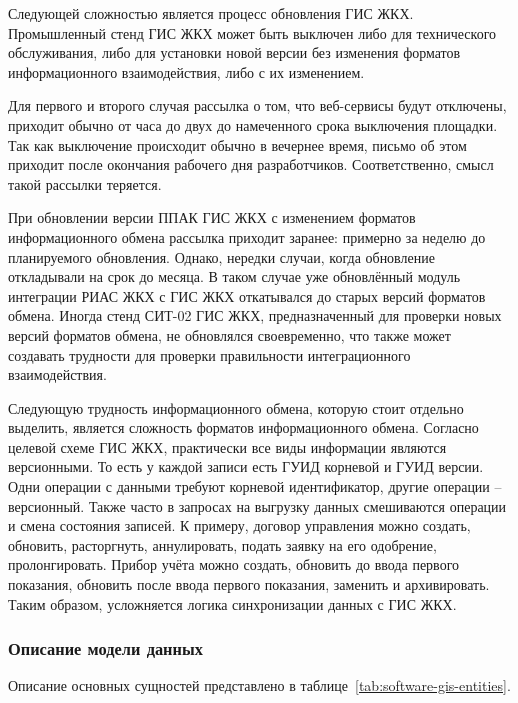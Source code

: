 Следующей сложностью является процесс обновления ГИС ЖКХ.
Промышленный стенд ГИС ЖКХ может быть выключен либо для технического обслуживания, либо для установки новой версии без изменения форматов информационного взаимодействия, либо с их изменением.

Для первого и второго случая рассылка о том, что веб-сервисы будут отключены, приходит обычно от часа до двух до намеченного срока выключения площадки.
Так как выключение происходит обычно в вечернее время, письмо об этом приходит после окончания рабочего дня разработчиков.
Соответственно, смысл такой рассылки теряется.

При обновлении версии ППАК ГИС ЖКХ с изменением форматов информационного обмена рассылка приходит заранее: примерно за неделю до планируемого обновления.
Однако, нередки случаи, когда обновление откладывали на срок до месяца.
В таком случае уже обновлённый модуль интеграции РИАС ЖКХ с ГИС ЖКХ откатывался до старых версий форматов обмена.
Иногда стенд СИТ-02 ГИС ЖКХ, предназначенный для проверки новых версий форматов обмена, не обновлялся своевременно, что также может создавать трудности для проверки правильности интеграционного взаимодействия.

Следующую трудность информационного обмена, которую стоит отдельно выделить, является сложность форматов информационного обмена.
Согласно целевой схеме ГИС ЖКХ, практически все виды информации являются версионными.
То есть у каждой записи есть ГУИД корневой и ГУИД версии.
Одни операции с данными требуют корневой идентификатор, другие операции -- версионный.
Также часто в запросах на выгрузку данных смешиваются операции и смена состояния записей.
К примеру, договор управления можно создать, обновить, расторгнуть, аннулировать, подать заявку на его одобрение, пролонгировать.
Прибор учёта можно создать, обновить до ввода первого показания, обновить после ввода первого показания, заменить и архивировать.
Таким образом, усложняется логика синхронизации данных с ГИС ЖКХ.

\subsubsection{Описание модели данных}
\label{head:software-gis-entities}

Описание основных сущностей представлено в таблице~\ref{tab:software-gis-entities}.

